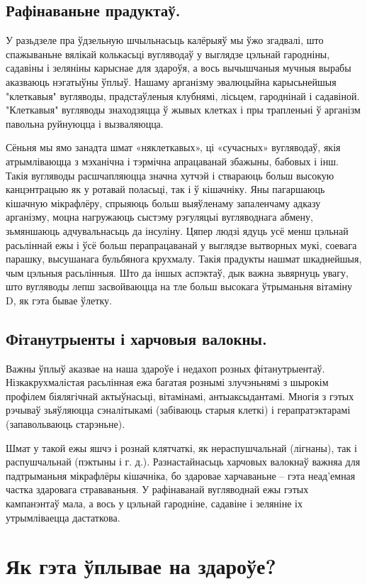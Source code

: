 \subsection{Рафінаваньне прадуктаў.}
У разьдзеле пра ўдзельную шчыльнасьць калёрыяў мы ўжо згадвалі, што спажываньне вялікай колькасьці вугляводаў у выглядзе цэльнай гародніны, садавіны і зеляніны карыснае для здароўя, а вось вычышчаныя мучныя вырабы аказваюць нэгатыўны ўплыў. Нашаму арганізму эвалюцыйна карысьнейшыя "клеткавыя" вугляводы, прадстаўленыя клубнямі, лісьцем, гароднінай і садавіной. "Клеткавыя" вугляводы знаходзяцца ў жывых клетках і пры трапленьні ў арганізм павольна руйнуюцца і вызваляюцца.

Сёньня мы ямо занадта шмат «няклеткавых», ці «сучасных» вугляводаў, якія атрымліваюцца з мэханічна і тэрмічна апрацаванай збажыны, бабовых і інш. Такія вугляводы расшчапляюцца значна хутчэй і ствараюць больш высокую канцэнтрацыю як у ротавай поласьці, так і ў кішачніку. Яны пагаршаюць кішачную мікрафлёру, спрыяюць больш выяўленаму запаленчаму адказу арганізму, моцна нагружаюць сыстэму рэгуляцыі вугляводнага абмену, зьмяншаюць адчувальнасьць да інсуліну. Цяпер людзі ядуць усё менш цэльнай расьліннай ежы і ўсё больш перапрацаванай у выглядзе вытворных мукі, соевага парашку, высушанага бульбянога крухмалу. Такія прадукты нашмат шкаднейшыя, чым цэльныя расьлінныя. Што да іншых аспэктаў, дык важна зьвярнуць увагу, што вугляводы лепш засвойваюцца на тле больш высокага ўтрыманьня вітаміну D, як гэта бывае ўлетку.

\subsection{Фітанутрыенты і харчовыя валокны.}
Важны ўплыў аказвае на наша здароўе і недахоп розных фітанутрыентаў. Нізкакрухмалістая расьлінная ежа багатая рознымі злучэньнямі з шырокім профілем біялягічнай актыўнасьці, вітамінамі, антыаксыдантамі. Многія з гэтых рэчываў зьяўляюцца сэналітыкамі (забіваюць старыя клеткі) і герапратэктарамі (запавольваюць старэньне).

Шмат у такой ежы яшчэ і рознай клятчаткі, як нераспушчальнай (лігнаны), так і распушчальнай (пэктыны і г. д.). Разнастайнасьць харчовых валокнаў важняа для падтрыманьня мікрафлёры кішачніка, бо здаровае харчаваньне – гэта неад'емная частка здаровага страваваньня. У рафінаванай вугляводнай ежы гэтых кампанэнтаў мала, а вось у цэльнай гародніне, садавіне і зеляніне іх утрымліваецца дастаткова.

\section{Як гэта ўплывае на здароўе?}

